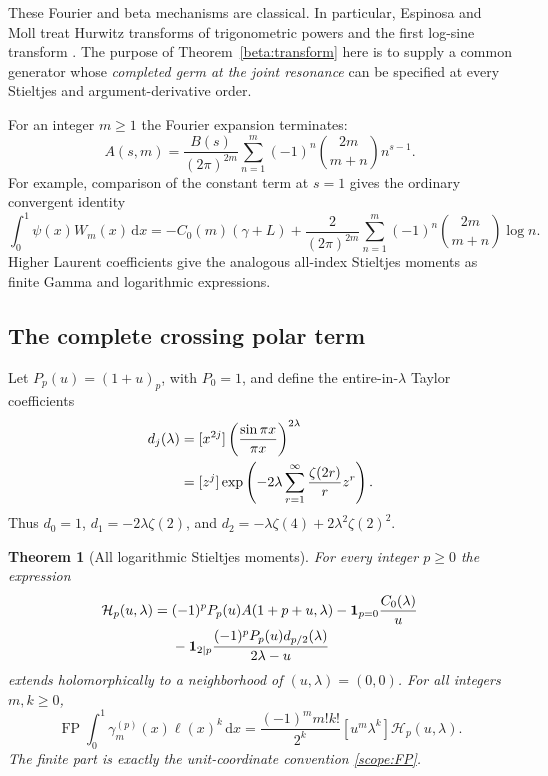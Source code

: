 \documentclass[11pt]{article}
\numberwithin{equation}{section}
\newtheorem{theorem}{Theorem}[section]
\theoremstyle{definition}
\theoremstyle{remark}
\DeclareMathOperator{\FP}{FP}
\newcommand{\dd}{\,\mathrm d}
\newcommand{\ind}{\mathbf 1}
\begin{document}
These Fourier and beta mechanisms are classical. In particular,
Espinosa and Moll treat Hurwitz transforms of trigonometric powers
and the first log-sine transform \cite[\S\S5,13]{EspinosaMoll}.
The purpose of Theorem~\ref{beta:transform} here is to supply a common
generator whose \emph{completed germ at the joint resonance} can be
specified at every Stieltjes and argument-derivative order.

For an integer $m\geq1$ the Fourier expansion terminates:
\begin{equation}\label{beta:integer}
 A(s,m)=\frac{B(s)}{(2\pi)^{2m}}
 \sum_{n=1}^m(-1)^n\binom{2m}{m+n}n^{s-1}.
\end{equation}
For example, comparison of the constant term at $s=1$ gives the
ordinary convergent identity
\begin{equation}\label{beta:psiinteger}
 \int_0^1\psi(x)W_m(x)\dd x
 =-C_0(m)(\gamma+L)
 +\frac{2}{(2\pi)^{2m}}
   \sum_{n=1}^m(-1)^n\binom{2m}{m+n}\log n.
\end{equation}
Higher Laurent coefficients give the analogous all-index Stieltjes
moments as finite Gamma and logarithmic expressions.

\subsection{The complete crossing polar term}

Let $P_p(u)=(1+u)_p$, with $P_0=1$, and define the entire-in-$\lambda$
Taylor coefficients
\begin{align}\label{beta:d}
 d_j(\lambda)
 &=[x^{2j}]\left(\frac{\sin\pi x}{\pi x}\right)^{2\lambda}\notag\\
 &=[z^j]\exp\left(-2\lambda
                 \sum_{r=1}^{\infty}\frac{\zeta(2r)}r z^r\right).
\end{align}
Thus $d_0=1$, $d_1=-2\lambda\zeta(2)$, and
$d_2=-\lambda\zeta(4)+2\lambda^2\zeta(2)^2$.

\begin{theorem}[All logarithmic Stieltjes moments]\label{beta:completion}
For every integer $p\geq0$ the expression
\begin{align}\label{beta:Hp}
 \mathcal H_p(u,\lambda)
 ={}&(-1)^pP_p(u)A(1+p+u,\lambda)
       -\ind_{p=0}\frac{C_0(\lambda)}u\notag\\
 &-\ind_{2\mid p}
       \frac{(-1)^pP_p(u)d_{p/2}(\lambda)}{2\lambda-u}
\end{align}
extends holomorphically to a neighborhood of $(u,\lambda)=(0,0)$.
For all integers $m,k\geq0$,
\begin{equation}\label{beta:allmoments}
 \boxed{\displaystyle
 \FP\int_0^1\gamma_m^{(p)}(x)\ell(x)^k\dd x
  =\frac{(-1)^m m!k!}{2^k}
      [u^m\lambda^k]\mathcal H_p(u,\lambda).}
\end{equation}
The finite part is exactly the unit-coordinate convention
\eqref{scope:FP}.
\end{theorem}
\end{document}
